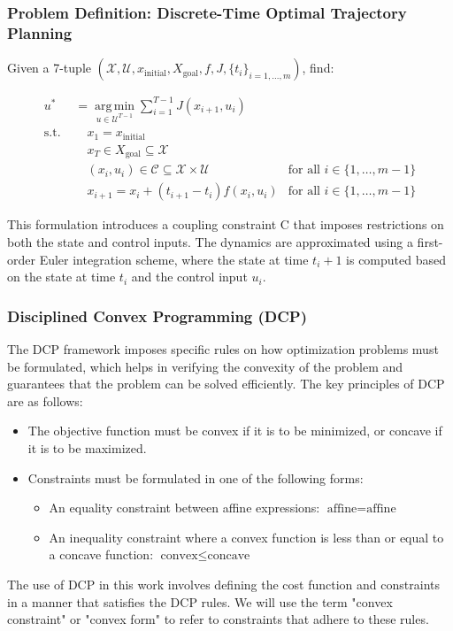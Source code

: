 \subsubsection{Problem Definition: Discrete-Time Optimal Trajectory Planning}

Given a 7-tuple $(\mathcal{X}, \mathcal{U}, x_{\text{initial}}, X_{\text{goal}}, f, J, \{t_i\}_{i=1,\dots,m})$, find:

\begin{align}
	u^* & = \underset{u \in \mathcal{U}^{T-1}}{\operatorname{arg\,min}} \sum_{i=1}^{T-1}
	J(x_{i+1}, u_{i})                                                                                                                                              \\ \text{s.t.
	}   & \quad x_1 = x_{\text{initial}}                                                                                                                           \\
	    & \quad x_T \in X_{\text{goal}} \subseteq \mathcal{X}                                                                                                      \\
	    & \quad (x_i, u_i) \in \mathcal{C} \subseteq \mathcal{X} \times \mathcal{U}      & \text{for all } i \in \{1, \dots, m-1\} \label{eq:coupling_constraints} \\
	    & \quad x_{i+1} = x_i + (t_{i+1} - t_i) f(x_i, u_i)                              & \text{for all } i \in \{1, \dots, m-1\} \label{eq:discrete_dynamics}
\end{align}

This formulation introduces a coupling constraint C that imposes restrictions on both the state and control inputs.
The dynamics are approximated using a first-order Euler integration scheme, where the state at time $t_i+1$ is computed based on the state at time
$t_i$ and the control input $u_i$.

\subsubsection{Disciplined Convex Programming (DCP)}

The DCP framework imposes specific rules on how optimization problems must be formulated, which helps in verifying the convexity of the problem and
guarantees that the problem can be solved efficiently.
The key principles of DCP are as follows:
\begin{itemize}
	\item The objective function must be convex if it is to be minimized, or concave if it is to
	      be maximized.
	\item Constraints must be formulated in one of the following forms: \begin{itemize}
		      \item An equality constraint between affine expressions: $\text{affine} = \text{affine}$
		      \item An inequality constraint where a convex function is less than or equal to a
		            concave function: $\text{convex} \leq \text{concave}$
	      \end{itemize}
\end{itemize}

The use of DCP in this work involves defining the cost function and constraints in a manner that satisfies the DCP rules.
We will use the term "convex constraint" or "convex form" to refer to constraints that adhere to these rules.
